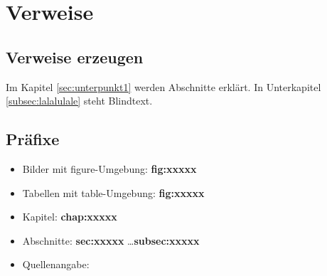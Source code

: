 \chapter{Verweise}
    \section{Verweise erzeugen}
        Im Kapitel \ref{sec:unterpunkt1} werden Abschnitte erklärt. In Unterkapitel \ref{subsec:lalalulale} steht Blindtext.

    \section{Präfixe}
        \begin{itemize}
            \item Bilder mit figure-Umgebung: \textbf{fig:xxxxx}
            \item Tabellen mit table-Umgebung: \textbf{fig:xxxxx}
            \item Kapitel: \textbf{chap:xxxxx}
            \item Abschnitte: \textbf{sec:xxxxx} \dots \textbf{subsec:xxxxx}
            \item Quellenangabe: \cite{papula2009}
        \end{itemize}
